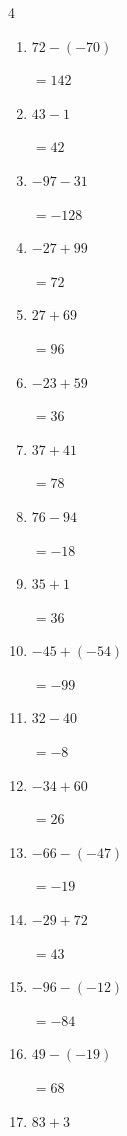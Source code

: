 \begin{multicols}{4}
\begin{enumerate}
        $=-132$

  \item $72-(-70)$

        $=142$

  \item $43-1$

        $=42$

  \item $-97-31$

        $=-128$

  \item $-27+99$

        $=72$

  \item $27+69$

        $=96$

  \item $-23+59$

        $=36$

  \item $37+41$

        $=78$

  \item $76-94$

        $=-18$

\columnbreak %

  \item $35+1$

        $=36$

  \item $-45+(-54)$

        $=-99$

  \item $32-40$

        $=-8$

  \item $-34+60$

        $=26$

  \item $-66-(-47)$

        $=-19$

  \item $-29+72$

        $=43$

  \item $-96-(-12)$

        $=-84$

  \item $49-(-19)$

        $=68$

  \item $83+3$


\end{enumerate}
\end{multicols}
